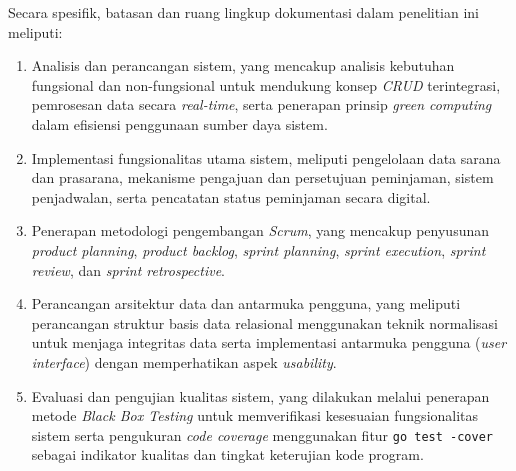 Secara spesifik, batasan dan ruang lingkup dokumentasi dalam penelitian ini meliputi:
\begin{enumerate}
    \item Analisis dan perancangan sistem, yang mencakup analisis kebutuhan fungsional dan non-fungsional untuk mendukung konsep \textit{CRUD} terintegrasi, pemrosesan data secara \textit{real-time}, serta penerapan prinsip \textit{green computing} dalam efisiensi penggunaan sumber daya sistem.
    \item Implementasi fungsionalitas utama sistem, meliputi pengelolaan data sarana dan prasarana, mekanisme pengajuan dan persetujuan peminjaman, sistem penjadwalan, serta pencatatan status peminjaman secara digital.
    \item Penerapan metodologi pengembangan \textit{Scrum}, yang mencakup penyusunan \textit{product planning}, \textit{product backlog}, \textit{sprint planning}, \textit{sprint execution}, \textit{sprint review}, dan \textit{sprint retrospective}.
    \item Perancangan arsitektur data dan antarmuka pengguna, yang meliputi perancangan struktur basis data relasional menggunakan teknik normalisasi untuk menjaga integritas data serta implementasi antarmuka pengguna (\textit{user interface}) dengan memperhatikan aspek \textit{usability}.
    \item Evaluasi dan pengujian kualitas sistem, yang dilakukan melalui penerapan metode \textit{Black Box Testing} untuk memverifikasi kesesuaian fungsionalitas sistem serta pengukuran \textit{code coverage} menggunakan fitur \texttt{go test -cover} sebagai indikator kualitas dan tingkat keterujian kode program.
\end{enumerate}
